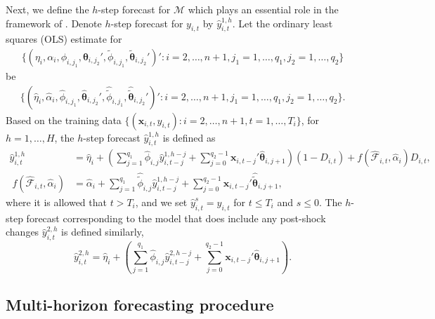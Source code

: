 \documentclass[11pt]{article}
\def\mbf#1{\mathbf{#1}} %
\def\mc#1{\mathcal{#1}} %
\def\mc#1{\mathcal{#1}}
\def\bs#1{\boldsymbol{#1}}
\theoremstyle{definition}
\begin{document}
Next, we define the $h$-step forecast for $\mc{M}$ which plays an essential role in the framework of \citet{quaedvlieg2021multi}. Denote $h$-step forecast for $y_{i,t}$ by $\hat{y}_{i,t}^{1,h}$. Let the ordinary least squares (OLS) estimate for
\begin{align*}
	\{(\eta_i, \alpha_i, \phi_{i,j_1}, \bs{\theta}_{i,j_2}', \tilde{\phi}_{i,j_1}, \tilde{\bs{\theta}}_{i,j_2}')' \colon i = 2, \ldots, n+1, j_1 = 1, \ldots, q_1, j_2 = 1, \ldots, q_2\}
\end{align*}
 be 
 \begin{align*}
 	\{(\hat{\eta}_i, \hat{\alpha}_i, \hat{\phi}_{i,j_1}, \hat{\bs{\theta}}_{i,j_2}', \hat{\tilde{\phi}}_{i,j_1}, \hat{\tilde{\bs{\theta}}}_{i,j_2}')' \colon i = 2, \ldots, n+1, j_1 = 1, \ldots, q_1, j_2 = 1, \ldots, q_2\}.
 \end{align*}
Based on the training data $\{(\mbf{x}_{i, t}, y_{i,t}) \colon i = 2, \ldots, n+1, t = 1, \ldots, T_i\}$, for $h = 1, \ldots, H$, the $h$-step forecast $\hat{y}_{i,t}^{1,h}$ is defined as
 \begin{align*}
 	\hat{y}_{i,t}^{1,h} &= \hat{\eta}_i + \left(\sum_{j=1}^{q_1}\hat{\phi}_{i,j}\hat{y}^{1,h-j}_{i, t-j} + \sum_{j=0}^{q_2-1}\mbf{x}_{i,t-j}'\hat{\bs{\theta}}_{i,j+1}\right)(1 - D_{i,t}) + f(\hat{\mathcal{F}}_{i,t},\hat{\alpha}_i)D_{i,t} ,\\[.2cm]
  \; f(\hat{\mc{F}}_{i,t},\hat{\alpha}_i ) &= \hat{\alpha}_i +  \sum_{j=1}^{q_{1}}\hat{\tilde{\phi}}_{i,j} \hat{y}^{1,h-j}_{i, t-j}+ \sum_{j=0}^{q_2-1}\mbf{x}_{i,t-j}'\hat{\tilde{\bs{\theta}}}_{i,j+1},
 \end{align*}
 where it is allowed that $t> T_i$, and we set $\hat{y}^{s}_{i, t}=y_{i,t}$ for $t \leq T_i$ and $s\leq 0$. The $h$-step forecast corresponding to the model that does include any post-shock changes $\hat{y}_{i,t}^{2,h}$ is defined similarly,
\begin{equation*}
 	\hat{y}_{i,t}^{2,h} = \hat{\eta}_i + \left(\sum_{j=1}^{q_1}\hat{\phi}_{i,j}\hat{y}^{2,h-j}_{i, t-j} + \sum_{j=0}^{q_2-1}\mbf{x}_{i,t-j}'\hat{\bs{\theta}}_{i,j+1}\right).
\end{equation*}


\subsection{Multi-horizon forecasting procedure}
\label{sec:multhor}
\end{document}
